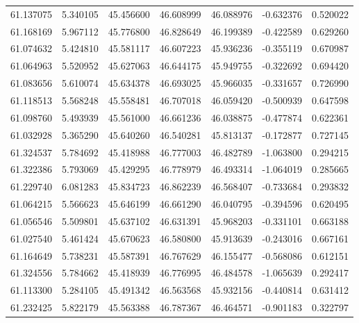 \begin{tabular}{rrrrrrr}
 61.137075 &   5.340105 &         45.456600 &         46.608999 &         46.088976 & -0.632376 &  0.520022 \\
 61.168169 &   5.967112 &         45.776800 &         46.828649 &         46.199389 & -0.422589 &  0.629260 \\
 61.074632 &   5.424810 &         45.581117 &         46.607223 &         45.936236 & -0.355119 &  0.670987 \\
 61.064963 &   5.520952 &         45.627063 &         46.644175 &         45.949755 & -0.322692 &  0.694420 \\
 61.083656 &   5.610074 &         45.634378 &         46.693025 &         45.966035 & -0.331657 &  0.726990 \\
 61.118513 &   5.568248 &         45.558481 &         46.707018 &         46.059420 & -0.500939 &  0.647598 \\
 61.098760 &   5.493939 &         45.561000 &         46.661236 &         46.038875 & -0.477874 &  0.622361 \\
 61.032928 &   5.365290 &         45.640260 &         46.540281 &         45.813137 & -0.172877 &  0.727145 \\
 61.324537 &   5.784692 &         45.418988 &         46.777003 &         46.482789 & -1.063800 &  0.294215 \\
 61.322386 &   5.793069 &         45.429295 &         46.778979 &         46.493314 & -1.064019 &  0.285665 \\
 61.229740 &   6.081283 &         45.834723 &         46.862239 &         46.568407 & -0.733684 &  0.293832 \\
 61.064215 &   5.566623 &         45.646199 &         46.661290 &         46.040795 & -0.394596 &  0.620495 \\
 61.056546 &   5.509801 &         45.637102 &         46.631391 &         45.968203 & -0.331101 &  0.663188 \\
 61.027540 &   5.461424 &         45.670623 &         46.580800 &         45.913639 & -0.243016 &  0.667161 \\
 61.164649 &   5.738231 &         45.587391 &         46.767629 &         46.155477 & -0.568086 &  0.612151 \\
 61.324556 &   5.784662 &         45.418939 &         46.776995 &         46.484578 & -1.065639 &  0.292417 \\
 61.113300 &   5.284105 &         45.491342 &         46.563568 &         45.932156 & -0.440814 &  0.631412 \\
 61.232425 &   5.822179 &         45.563388 &         46.787367 &         46.464571 & -0.901183 &  0.322797 \\

\end{tabular}
